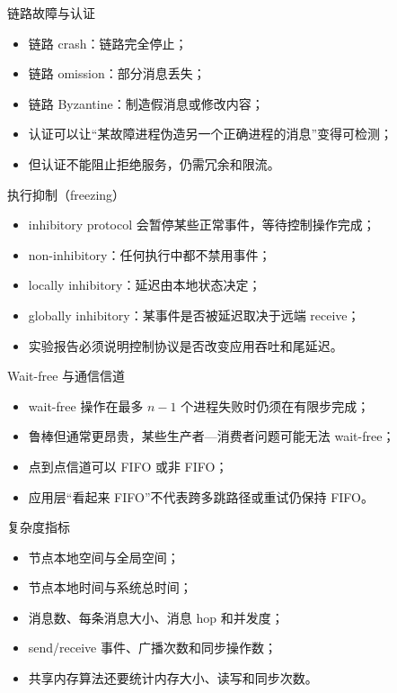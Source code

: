 \documentclass[UTF8,fontset=none,aspectratio=169,10pt]{beamer}
\begin{document}
\begin{frame}{链路故障与认证}
\begin{itemize}
  \item 链路 crash：链路完全停止；
  \item 链路 omission：部分消息丢失；
  \item 链路 Byzantine：制造假消息或修改内容；
  \item 认证可以让“某故障进程伪造另一个正确进程的消息”变得可检测；
  \item 但认证不能阻止拒绝服务，仍需冗余和限流。
\end{itemize}
\end{frame}

\begin{frame}{执行抑制（freezing）}
\begin{itemize}
  \item inhibitory protocol 会暂停某些正常事件，等待控制操作完成；
  \item non-inhibitory：任何执行中都不禁用事件；
  \item locally inhibitory：延迟由本地状态决定；
  \item globally inhibitory：某事件是否被延迟取决于远端 receive；
  \item 实验报告必须说明控制协议是否改变应用吞吐和尾延迟。
\end{itemize}
\end{frame}

\begin{frame}{Wait-free 与通信信道}
\begin{itemize}
  \item wait-free 操作在最多 $n-1$ 个进程失败时仍须在有限步完成；
  \item 鲁棒但通常更昂贵，某些生产者—消费者问题可能无法 wait-free；
  \item 点到点信道可以 FIFO 或非 FIFO；
  \item 应用层“看起来 FIFO”不代表跨多跳路径或重试仍保持 FIFO。
\end{itemize}
\end{frame}


\begin{frame}{复杂度指标}
\begin{itemize}
  \item 节点本地空间与全局空间；
  \item 节点本地时间与系统总时间；
  \item 消息数、每条消息大小、消息 hop 和并发度；
  \item send/receive 事件、广播次数和同步操作数；
  \item 共享内存算法还要统计内存大小、读写和同步次数。
\end{itemize}
\vfill
{}
\end{frame}
\end{document}
